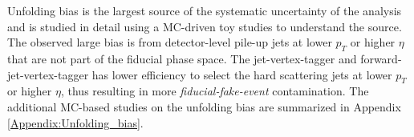 Unfolding bias is the largest source of the systematic uncertainty of the analysis and is studied in detail using a MC-driven toy studies to understand the source. The observed large bias is from detector-level pile-up jets at lower $p_{T}$ or higher $\eta$ that are not part of the fiducial phase space. The jet-vertex-tagger and forward-jet-vertex-tagger has lower efficiency to select the hard scattering jets at lower $p_{T}$ or higher $\eta$, thus resulting in more \textit{fiducial-fake-event} contamination. The additional MC-based studies on the unfolding bias are summarized in Appendix \ref{Appendix:Unfolding_bias}. 
